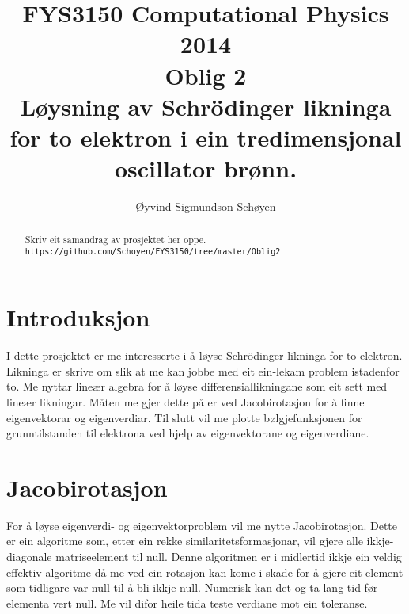 \documentclass[11pt, a4paper]{article}
\begin{document}
\begin{titlepage}

  \title{\normalsize FYS3150 Computational Physics 2014\\
  \vspace{10mm}
  \huge Oblig 2\\
  \vspace{10mm}
  \normalsize {\bf Løysning av Schrödinger likninga for to elektron i ein tredimensjonal oscillator brønn.}}

  \author{Øyvind Sigmundson Schøyen}

\end{titlepage}

\maketitle

\newpage
\begin{abstract}
  Skriv eit samandrag av prosjektet her oppe. \\
  \texttt{https://github.com/Schoyen/FYS3150/tree/master/Oblig2}
\end{abstract}

\newpage
  \tableofcontents
\newpage

\section{Introduksjon}
  I dette prosjektet er me interesserte i å løyse Schrödinger likninga for to elektron. Likninga er skrive om slik at me kan jobbe med eit ein-lekam problem 
  istadenfor to. Me nyttar lineær algebra for å løyse differensiallikningane som eit sett med lineær likningar. Måten me gjer dette på er ved Jacobirotasjon 
  for å finne eigenvektorar og eigenverdiar. Til slutt vil me plotte bølgjefunksjonen for grunntilstanden til elektrona ved hjelp av eigenvektorane og 
  eigenverdiane.


\section{Jacobirotasjon}
  For å løyse eigenverdi- og eigenvektorproblem vil me nytte Jacobirotasjon. Dette er ein algoritme som, etter ein rekke similaritetsformasjonar, vil 
  gjere alle ikkje-diagonale matriseelement til null. Denne algoritmen er i midlertid ikkje ein veldig effektiv algoritme då me ved ein rotasjon kan kome 
  i skade for å gjere eit element som tidligare var null til å bli ikkje-null. Numerisk kan det og ta lang tid før elementa vert null. Me vil difor heile 
  tida teste verdiane mot ein toleranse.
\end{document}
